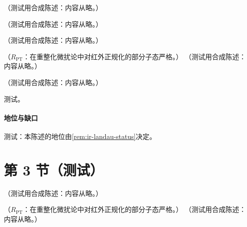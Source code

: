 \begin{remark}\label{rem:ir-euclid-corners}
（测试用合成陈述：内容从略。）
\end{remark}

\begin{example}\label{ex:ir-euclid-triangle}
（测试用合成陈述：内容从略。）
\end{example}

\begin{definition}\label{def:ir-pinch-surface}
（测试用合成陈述：内容从略。）
\end{definition}

\begin{proposition}\label{prop:ir-coleman-norton}
（$R_{\mathrm{PT}}$：在重整化微扰论中对红外正规化的部分子态严格。）
（测试用合成陈述：内容从略。）
\end{proposition}

\begin{proposition}\label{prop:ir-pinch-classification}
（测试用合成陈述：内容从略。）
\end{proposition}
\begin{proofsketch}测试。\end{proofsketch}
\paragraph{地位与缺口}测试：本陈述的地位由\cref{rem:ir-landau-status}决定。

\section{第 3 节（测试）}\label{sec:ir-pinch}

\begin{definition}[区域标度]\label{def:ir-scalings}
（测试用合成陈述：内容从略。）
\end{definition}

\begin{proposition}\label{prop:ir-power-counting}
（$R_{\mathrm{PT}}$：在重整化微扰论中对红外正规化的部分子态严格。）
（测试用合成陈述：内容从略。）
\end{proposition}

